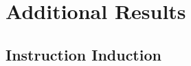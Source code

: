 \clearpage
\newpage
\section{Additional Results}\label{sec:add_res}


\subsection{Instruction Induction}\label{sec:app_ii}


